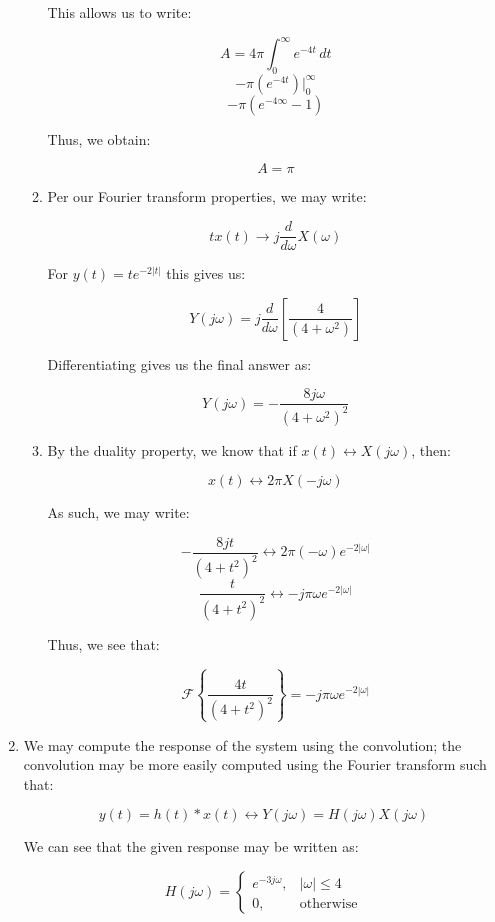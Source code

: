 \begin{enumerate}
\begin{enumerate}
        This allows us to write:

        $$A=4\pi\int_{0}^{\infty}e^{-4t}\,dt$$
        $$-\pi \left(e^{-4t}\right)\Big|_0^{\infty}$$
        $$-\pi \left(e^{-4\infty}-1\right)$$

        Thus, we obtain:

        $$\boxed{A=\pi}$$

      \item Per our Fourier transform properties, we may write:

        $$tx(t)\to j\frac{d}{d\omega}X(\omega)$$

        For $y(t)=te^{-2|t|}$ this gives us:

        $$Y(j\omega)=j\frac{d}{d\omega}\left[ \frac{4}{(4+\omega^2)} \right]$$

        Differentiating gives us the final answer as:

        $$\boxed{Y(j\omega)=-\frac{8j\omega}{(4+\omega^2)^2}}$$

      \item By the duality property, we know that if $x(t)\leftrightarrow X(j\omega)$, then:

        $$x(t)\leftrightarrow 2\pi X(-j\omega)$$

        As such, we may write:

        $$-\frac{8jt}{(4+t^2)^2}\leftrightarrow 2\pi(-\omega)e^{-2|\omega|}$$
        $$\frac{t}{(4+t^2)^2}\leftrightarrow -j\pi\omega e^{-2|\omega|}$$

        Thus, we see that:

        $$\boxed{\mathcal{F}\left\{ \frac{4t}{(4+t^2)^2} \right\}=-j\pi\omega e^{-2|\omega|}}$$

    \end{enumerate}

  \item We may compute the response of the system using the convolution; the convolution may be more easily computed using the Fourier transform such that:

    $$y(t)=h(t)*x(t)\leftrightarrow Y(j\omega)=H(j\omega)X(j\omega)$$

    We can see that the given response may be written as:

    $$H(j\omega)=\left\{\begin{array}{ll} e^{-3j\omega},&|\omega|\leq4\\0,&\text{otherwise}\end{array}$$

    \begin{enumerate}


\end{enumerate}
\end{enumerate}
